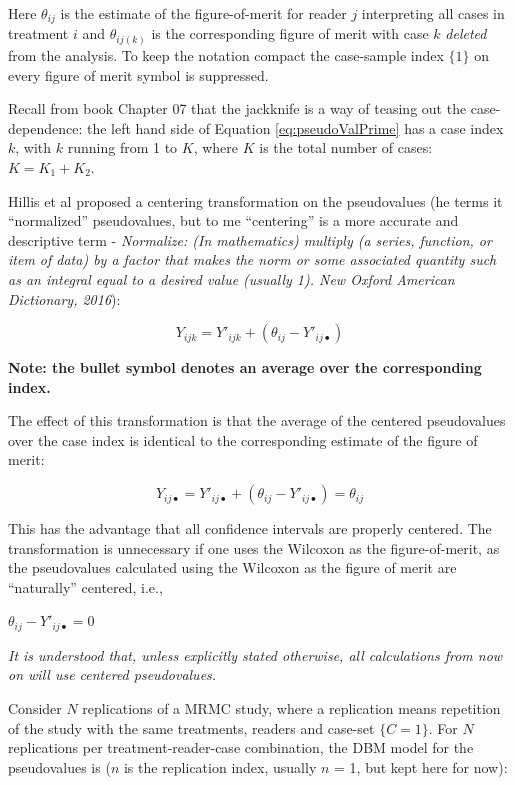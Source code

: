 \documentclass[
]{book}
\begin{document}
Here \(\theta_{ij}\) is the estimate of the figure-of-merit for reader \(j\) interpreting all cases in treatment \(i\) and \(\theta_{ij(k)}\) is the corresponding figure of merit with case \(k\) \emph{deleted} from the analysis. To keep the notation compact the case-sample index \(\{1\}\) on every figure of merit symbol is suppressed.

Recall from book Chapter 07 that the jackknife is a way of teasing out the case-dependence: the left hand side of Equation \eqref{eq:pseudoValPrime} has a case index \(k\), with \(k\) running from 1 to \(K\), where \(K\) is the total number of cases: \(K=K_1+K_2\).

Hillis et al \citep{RN1866} proposed a centering transformation on the pseudovalues (he terms it ``normalized'' pseudovalues, but to me ``centering'' is a more accurate and descriptive term - \emph{Normalize: (In mathematics) multiply (a series, function, or item of data) by a factor that makes the norm or some associated quantity such as an integral equal to a desired value (usually 1). New Oxford American Dictionary, 2016}):

\begin{equation}
Y_{ijk}=Y'_{ijk}+\left (\theta_{ij} - Y'_{ij\bullet}  \right )
\label{eq:pValCentered}
\end{equation}

\textbf{Note: the bullet symbol denotes an average over the corresponding index.}

The effect of this transformation is that the average of the centered pseudovalues over the case index is identical to the corresponding estimate of the figure of merit:

\begin{equation}
Y_{ij\bullet}=Y'_{ij\bullet}+\left (\theta_{ij} - Y'_{ij\bullet}  \right )=\theta_{ij}
\label{eq:EffectOfCentering}
\end{equation}

This has the advantage that all confidence intervals are properly centered. The transformation is unnecessary if one uses the Wilcoxon as the figure-of-merit, as the pseudovalues calculated using the Wilcoxon as the figure of merit are ``naturally'' centered, i.e.,

\(\theta_{ij} - Y'_{ij\bullet} = 0\)

\emph{It is understood that, unless explicitly stated otherwise, all calculations from now on will use centered pseudovalues.}

Consider \(N\) replications of a MRMC study, where a replication means repetition of the study with the same treatments, readers and case-set \(\{C=1\}\). For \(N\) replications per treatment-reader-case combination, the DBM model for the pseudovalues is (\(n\) is the replication index, usually \(n\) = 1, but kept here for now):
\end{document}
